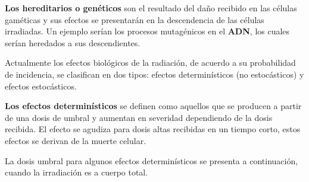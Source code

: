 \textbf{Los hereditarios o genéticos} son el resultado del daño recibido en las células gaméticas y sus efectos se presentarán en la descendencia de las células irradiadas. Un ejemplo serían los procesos mutagénicos en el \textbf{ADN}, los cuales serían heredados a sus descendientes.

Actualmente los efectos biológicos de la radiación, de acuerdo a su probabilidad de incidencia, se clasifican en dos tipos: efectos determinísticos (no estocásticos) y efectos estocásticos.

\textbf{Los efectos determinísticos} se definen como aquellos que se producen a partir de una dosis de umbral y aumentan en severidad dependiendo de la dosis recibida. El efecto se agudiza para dosis altas recibidas en un tiempo corto, estos efectos se derivan de la muerte celular.

La dosis umbral para algunos efectos determinísticos se presenta a continuación, cuando la irradiación es a cuerpo total.
